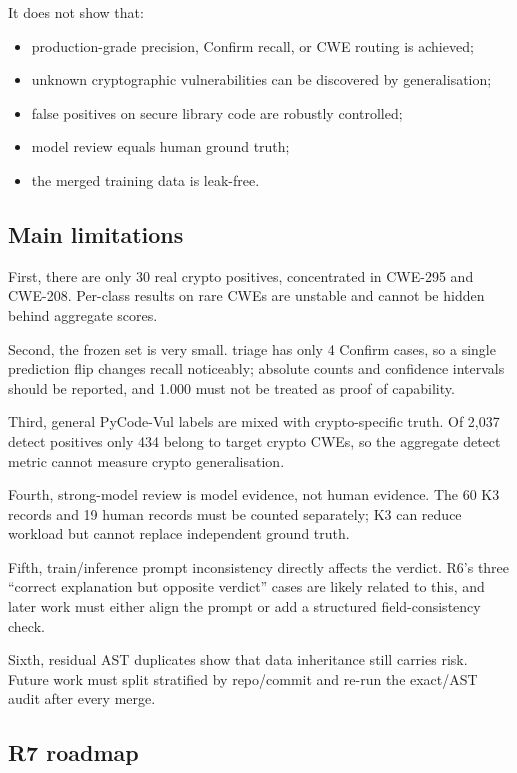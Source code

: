 \documentclass[11pt]{article}
\begin{document}
It does not show that:

\begin{itemize}
  \item production-grade precision, Confirm recall, or CWE routing is achieved;
  \item unknown cryptographic vulnerabilities can be discovered by generalisation;
  \item false positives on secure library code are robustly controlled;
  \item model review equals human ground truth;
  \item the merged training data is leak-free.
\end{itemize}

\subsection{Main limitations}

First, there are only 30 real crypto positives, concentrated in CWE-295 and CWE-208. Per-class results on rare
CWEs are unstable and cannot be hidden behind aggregate scores.

Second, the frozen set is very small. triage has only 4 Confirm cases, so a single prediction flip changes
recall noticeably; absolute counts and confidence intervals should be reported, and 1.000 must not be treated
as proof of capability.

Third, general PyCode-Vul labels are mixed with crypto-specific truth. Of 2,037 detect positives only 434
belong to target crypto CWEs, so the aggregate detect metric cannot measure crypto generalisation.

Fourth, strong-model review is model evidence, not human evidence. The 60 K3 records and 19 human records must
be counted separately; K3 can reduce workload but cannot replace independent ground truth.

Fifth, train/inference prompt inconsistency directly affects the verdict. R6's three ``correct explanation but
opposite verdict'' cases are likely related to this, and later work must either align the prompt or add a
structured field-consistency check.

Sixth, residual AST duplicates show that data inheritance still carries risk. Future work must split
stratified by repo/commit and re-run the exact/AST audit after every merge.

\subsection{R7 roadmap}
\end{document}
